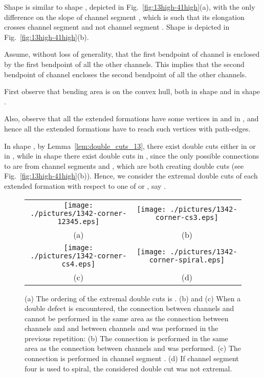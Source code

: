 \documentclass[a4paper,10pt]{llncs}
\renewenvironment{proof}
{{\bf Proof:}}{\hspace*{\fill}\par\vspace{2mm}}
\begin{document}
\begin{proof}
Shape   is similar to shape  , depicted in Fig.~\ref{fig:13high-41high}(a), with the only difference on the slope of channel segment , which is such that its elongation crosses channel segment  and not channel segment . Shape   is depicted in Fig.~\ref{fig:13high-41high}(b).

Assume, without loss of generality, that the first bendpoint of channel  is enclosed by the first bendpoint of all the other channels. This implies that the second bendpoint of channel  encloses the second bendpoint of all the other channels.

First observe that bending area  is on the convex hull, both in shape   and in shape  .

Also, observe that all the extended formations have some vertices in  and in , and hence all the extended formations have to reach such vertices with path-edges.

In shape  , by Lemma~\ref{lem:double_cuts_13}, there exist double cuts either in  or in , while in shape   there exist double cuts in , since the only possible connections to  are from channel segments  and , which are both creating double cuts (see Fig.~\ref{fig:13high-41high}(b)). Hence, we consider the extremal double cuts of each extended formation with respect to one of  or , say .

\begin{figure}[htb]
\begin{center}
\begin{tabular}{cc}
\mbox{\texttt{[image: ./pictures/1342-corner-12345.eps]}} \hspace{0.1cm} &
\mbox{\texttt{[image: ./pictures/1342-corner-cs3.eps]}} \\
(a) & (b)\\
\mbox{\texttt{[image: ./pictures/1342-corner-cs4.eps]}} \hspace{0.1cm} &
\mbox{\texttt{[image: ./pictures/1342-corner-spiral.eps]}} \\
(c) & (d)\\
\end{tabular}
\caption{(a) The ordering of the extremal double cuts is . (b) and (c) When a double defect is encountered, the connection between channels  and  cannot be performed in the same area as the connection between channels  and  and between channels  and  was performed in the previous repetition: (b) The connection is performed in the same area as the connection between channels  and  was performed. (c) The connection is performed in channel segment . (d) If channel segment four is used to spiral, the considered double cut was not extremal.}\label{fig:bend23-no-ordered}
\end{center}
\end{figure}


\end{proof}
\end{document}
